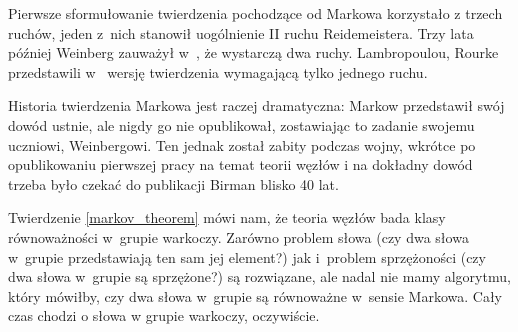 Pierwsze sformułowanie twierdzenia pochodzące od Markowa \cite{markov36} korzystało z trzech ruchów, jeden z~nich stanowił uogólnienie II ruchu Reidemeistera.
Trzy lata później Weinberg zauważył w~\cite{weinberg39}, że wystarczą dwa ruchy.
%
Lambropoulou, Rourke przedstawili w~\cite{lambropoulou97} wersję twierdzenia wymagającą tylko jednego ruchu.
%
%

Historia twierdzenia Markowa jest raczej dramatyczna: Markow przedstawił swój dowód ustnie, ale nigdy go nie opublikował, zostawiając to zadanie swojemu uczniowi, Weinbergowi.
Ten jednak został zabity podczas wojny, wkrótce po opublikowaniu pierwszej pracy na temat teorii węzłów i na dokładny dowód trzeba było czekać do publikacji Birman \cite{birman74} blisko 40 lat.
%

Twierdzenie \ref{markov_theorem} mówi nam, że teoria węzłów bada klasy równoważności w~grupie warkoczy.
Zarówno problem słowa (czy dwa słowa w~grupie przedstawiają ten sam jej element?) jak i~problem sprzężoności (czy dwa słowa w~grupie są sprzężone?) są rozwiązane, ale nadal nie mamy algorytmu, który mówiłby, czy dwa słowa w~grupie są równoważne w~sensie Markowa.
Cały czas chodzi o słowa w grupie warkoczy, oczywiście.

